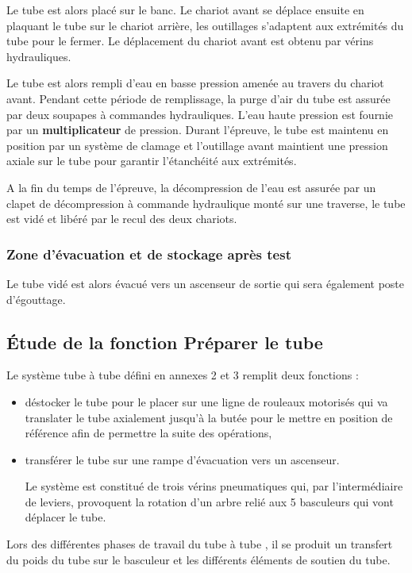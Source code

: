 Le tube est alors placé sur le banc. Le chariot avant se déplace ensuite en plaquant le tube sur le chariot arrière, les outillages s'adaptent aux extrémités du tube pour le fermer. Le déplacement du chariot avant est obtenu par vérins hydrauliques.

Le tube est alors rempli d'eau en basse pression amenée au travers du chariot avant. Pendant cette période de remplissage, la purge d'air du tube est assurée par deux soupapes à commandes hydrauliques. L'eau haute pression est fournie par un \textbf{multiplicateur} de pression. Durant l'épreuve, le tube est maintenu en position par un système de clamage et l'outillage avant maintient une pression axiale sur le tube pour garantir l'étanchéité aux extrémités.

A la fin du temps de l'épreuve, la décompression de l'eau est assurée par un clapet de décompression à commande hydraulique monté sur une traverse, le tube est vidé et libéré par le recul des deux chariots.

\subsubsection{Zone d'évacuation et de stockage après test}

Le tube vidé est alors évacué vers un ascenseur de sortie qui sera également poste d'égouttage.

\subsection{Étude de la fonction \og Préparer le tube \fg}

Le système \og tube à tube \fg défini en annexes 2 et 3 remplit deux fonctions :
\begin{itemize}
 \item déstocker le tube pour le placer sur une ligne de rouleaux motorisés qui va translater le tube axialement jusqu'à la butée pour le mettre en position de référence afin de permettre la suite des opérations,
 \item transférer le tube sur une rampe d'évacuation vers un ascenseur.
 
Le système est constitué de trois vérins pneumatiques qui, par l'intermédiaire de leviers, provoquent la rotation d'un arbre relié aux 5 basculeurs qui vont déplacer le tube.
\end{itemize}

Lors des différentes phases de travail du \og tube à tube \fg, il se produit un transfert du poids du tube sur le basculeur et les différents éléments de soutien du tube.

